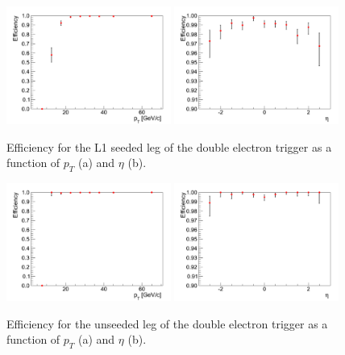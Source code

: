 \begin{figure}[!ht]
\begin{center}
\includegraphics[width=0.48\textwidth]{figures/ElectronTriggerEffVsPt_Ele17Ele8WithL1Seed.pdf}
\includegraphics[width=0.48\textwidth]{figures/ElectronTriggerEffVsEta_Ele17Ele8WithL1Seed.pdf}
\end{center}
\caption{Efficiency for the L1 seeded leg of the double electron trigger as a function of $p_{T}$ (a) and $\eta$ (b).}
\label{fig:Ele17Ele8TriggerEfficiencySeededLeg}
\end{figure} 
\begin{figure}[!ht]
\begin{center}
\includegraphics[width=0.48\textwidth]{figures/ElectronTriggerEffVsPt_Ele17Ele8.pdf}
\includegraphics[width=0.48\textwidth]{figures/ElectronTriggerEffVsEta_Ele17Ele8.pdf}
\end{center}
\caption{Efficiency for the unseeded leg of the double electron trigger as a function of $p_{T}$ (a) and $\eta$ (b).}
\label{fig:Ele17Ele8TriggerEfficiencyUnseededLeg}
\end{figure}

